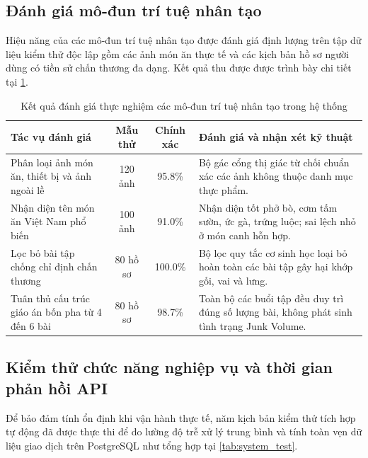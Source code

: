 \subsection{Đánh giá mô-đun trí tuệ nhân tạo}
\label{subsec:danhgia_ai}

Hiệu năng của các mô-đun trí tuệ nhân tạo được đánh giá định lượng trên tập dữ liệu kiểm thử độc lập gồm các ảnh món ăn thực tế và các kịch bản hồ sơ người dùng có tiền sử chấn thương đa dạng. Kết quả thu được được trình bày chi tiết tại \cref{tab:ai_eval}.

\begin{table}[htbp]
\centering
\small
\caption{Kết quả đánh giá thực nghiệm các mô-đun trí tuệ nhân tạo trong hệ thống}
\label{tab:ai_eval}
\begin{tabularx}{\textwidth}{>{\raggedright\arraybackslash}p{4.2cm} c c >{\raggedright\arraybackslash}X}
    \toprule
    \textbf{Tác vụ đánh giá} & \textbf{Mẫu thử} & \textbf{Chính xác} & \textbf{Đánh giá và nhận xét kỹ thuật} \\
    \midrule
    Phân loại ảnh món ăn, thiết bị và ảnh ngoài lề & 120 ảnh & 95.8\% & Bộ gác cổng thị giác từ chối chuẩn xác các ảnh không thuộc danh mục thực phẩm. \\
    \addlinespace[4pt]
    Nhận diện tên món ăn Việt Nam phổ biến & 100 ảnh & 91.0\% & Nhận diện tốt phở bò, cơm tấm sườn, ức gà, trứng luộc; sai lệch nhỏ ở món canh hỗn hợp. \\
    \addlinespace[4pt]
    Lọc bỏ bài tập chống chỉ định chấn thương & 80 hồ sơ & 100.0\% & Bộ lọc quy tắc cơ sinh học loại bỏ hoàn toàn các bài tập gây hại khớp gối, vai và lưng. \\
    \addlinespace[4pt]
    Tuân thủ cấu trúc giáo án bốn pha từ 4 đến 6 bài & 80 hồ sơ & 98.7\% & Toàn bộ các buổi tập đều duy trì đúng số lượng bài, không phát sinh tình trạng Junk Volume. \\
    \bottomrule
\end{tabularx}
\end{table}

\subsection{Kiểm thử chức năng nghiệp vụ và thời gian phản hồi API}
\label{subsec:kiemthu_hethong}

Để bảo đảm tính ổn định khi vận hành thực tế, năm kịch bản kiểm thử tích hợp tự động đã được thực thi để đo lường độ trễ xử lý trung bình và tính toàn vẹn dữ liệu giao dịch trên PostgreSQL như tổng hợp tại \cref{tab:system_test}.

